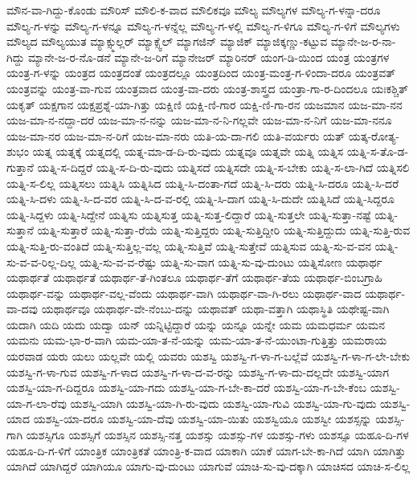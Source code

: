 {ಮೌನ-ವಾ-ಗಿದ್ದು-ಕೊಂಡು
ಮೌರಿಸ್
ಮೌಲಿ-ಕ-ವಾದ
ಮೌಲಿಕವೂ
ಮೌಲ್ಯ
ಮೌಲ್ಯಗಳ
ಮೌಲ್ಯ-ಗ-ಳನ್ನಾ-ದರೂ
ಮೌಲ್ಯ-ಗ-ಳನ್ನು
ಮೌಲ್ಯ-ಗ-ಳನ್ನೂ
ಮೌಲ್ಯ-ಗ-ಳನ್ನೆಲ್ಲ
ಮೌಲ್ಯ-ಗ-ಳಲ್ಲಿ
ಮೌಲ್ಯ-ಗ-ಳಿಗೂ
ಮೌಲ್ಯ-ಗ-ಳಿಗೆ
ಮೌಲ್ಯಗಳು
ಮೌಲ್ಯದ
ಮೌಲ್ಯಯುತ
ಮ್ಯಾಕ್ಸ್ಮುಲ್ಲರ್
ಮ್ಯಾಕ್ಸ್ವೆಲ್
ಮ್ಯಾಗಜಿನ್
ಮ್ಯಾಜಿಕ್
ಮ್ಯಾಜಿಕ್ಕಣ್ಣು-ಕಟ್ಟುವ
ಮ್ಯಾನೇ-ಜ-ರ-ನಾ-ಗಿದ್ದು
ಮ್ಯಾನೇ-ಜ-ರ-ನೊ-ಡನೆ
ಮ್ಯಾನೇ-ಜ-ರಿಗೆ
ಮ್ಯಾನೇಜರ್
ಮ್ಯಾರಿನರ್
ಯಂಗ-ಡಿ-ಯಿಂದ
ಯಂತ್ರ
ಯಂತ್ರಗಳ
ಯಂತ್ರ-ಗ-ಳನ್ನು
ಯಂತ್ರದ
ಯಂತ್ರದಂತೆ
ಯಂತ್ರದಲ್ಲೂ
ಯಂತ್ರದಿಂದ
ಯಂತ್ರ-ಮಂತ್ರ-ಗ-ಳಿಂದಾ-ದರೂ
ಯಂತ್ರವತ್
ಯಂತ್ರವನ್ನು
ಯಂತ್ರ-ವಾ-ಗುವ
ಯಂತ್ರವಾದ
ಯಂತ್ರ-ವಾ-ದರು
ಯಂತ್ರ-ಶಾಸ್ತ್ರದ
ಯಂತ್ರಾ-ಗಾ-ರ-ದಿಂದಲೂ
ಯಃಕಶ್ಚಿತ್
ಯಕೃತ್
ಯಕ್ಷಗಾನ
ಯಕ್ಷಪ್ರಶ್ನೆ-ಯಾ-ಗಿತ್ತು
ಯಕ್ಷಿಣಿ
ಯಕ್ಷಿ-ಣಿ-ಗಾರ
ಯಕ್ಷಿ-ಣಿ-ಗಾ-ರನ
ಯಜಮಾನ
ಯಜ-ಮಾ-ನನ
ಯಜ-ಮಾ-ನ-ನದ್ದಾ-ದರೆ
ಯಜ-ಮಾ-ನ-ನನ್ನು
ಯಜ-ಮಾ-ನ-ನಿ-ಗಲ್ಲವೇ
ಯಜ-ಮಾ-ನ-ನಿಗೆ
ಯಜ-ಮಾ-ನನೂ
ಯಜ-ಮಾ-ನರ
ಯಜ-ಮಾ-ನ-ರಿಗೆ
ಯಜ-ಮಾ-ನರು
ಯತಿ-ಯ-ದಾ-ಗಲಿ
ಯತಿ-ವರ್ಯರು
ಯತ್
ಯತ್ಕ-ರೋತ್ಯ-ಶುಭಂ
ಯತ್ನ
ಯತ್ನಕ್ಕೆ
ಯತ್ನದಲ್ಲಿ
ಯತ್ನ-ಮಾ-ಡ-ದಿ-ರು-ವುದು
ಯತ್ನವೂ
ಯತ್ನವೇ
ಯತ್ನಿ
ಯತ್ನಿಸ
ಯತ್ನಿ-ಸ-ತೊ-ಡ-ಗುತ್ತಾನೆ
ಯತ್ನಿ-ಸ-ದಿದ್ದರೆ
ಯತ್ನಿ-ಸ-ದಿ-ರು-ವುದು
ಯತ್ನಿಸದೆ
ಯತ್ನಿಸದೇ
ಯತ್ನಿ-ಸ-ಬೇಕು
ಯತ್ನಿ-ಸ-ಲಾ-ಗಿದೆ
ಯತ್ನಿಸಲಿ
ಯತ್ನಿ-ಸ-ಲಿಲ್ಲ
ಯತ್ನಿಸಲು
ಯತ್ನಿಸಿ
ಯತ್ನಿಸಿದ
ಯತ್ನಿ-ಸಿ-ದಂತಾ-ಗದೆ
ಯತ್ನಿ-ಸಿ-ದರು
ಯತ್ನಿ-ಸಿ-ದರೂ
ಯತ್ನಿ-ಸಿ-ದರೆ
ಯತ್ನಿ-ಸಿ-ದಳು
ಯತ್ನಿ-ಸಿ-ದ-ವರ
ಯತ್ನಿ-ಸಿ-ದ-ವ-ರಲ್ಲಿ
ಯತ್ನಿ-ಸಿ-ದಾಗ
ಯತ್ನಿ-ಸಿ-ದುದೇ
ಯತ್ನಿಸಿದೆ
ಯತ್ನಿ-ಸಿದ್ದರೂ
ಯತ್ನಿ-ಸಿದ್ದಳು
ಯತ್ನಿ-ಸಿದ್ದೇನೆ
ಯತ್ನಿಸು
ಯತ್ನಿಸುತ್ತ
ಯತ್ನಿ-ಸುತ್ತ-ಲಿದ್ದಾರೆ
ಯತ್ನಿ-ಸುತ್ತಲೇ
ಯತ್ನಿ-ಸುತ್ತಾ-ನಷ್ಟೆ
ಯತ್ನಿ-ಸುತ್ತಾನೆ
ಯತ್ನಿ-ಸುತ್ತಾರೆ
ಯತ್ನಿ-ಸುತ್ತಾ-ರೆಯೆ
ಯತ್ನಿ-ಸುತ್ತಿದ್ದರು
ಯತ್ನಿ-ಸುತ್ತಿದ್ದೀರಿ
ಯತ್ನಿ-ಸುತ್ತಿದ್ದುದು
ಯತ್ನಿ-ಸುತ್ತಿ-ರುವ
ಯತ್ನಿ-ಸುತ್ತಿ-ರು-ವಂತಿದೆ
ಯತ್ನಿ-ಸುತ್ತಿಲ್ಲ-ವಲ್ಲ
ಯತ್ನಿ-ಸುತ್ತಿವೆ
ಯತ್ನಿ-ಸುತ್ತೇವೆ
ಯತ್ನಿಸುವ
ಯತ್ನಿ-ಸು-ವ-ವನ
ಯತ್ನಿ-ಸು-ವ-ವ-ರಿಲ್ಲ-ದಿಲ್ಲ
ಯತ್ನಿ-ಸು-ವ-ವ-ರೆಷ್ಟು
ಯತ್ನಿ-ಸು-ವಾಗ
ಯತ್ನಿ-ಸು-ವು-ದುಂಟು
ಯತ್ನಿಸೋಣ
ಯಥಾರ್ಥ
ಯಥಾರ್ಥತೆ
ಯಥಾರ್ಥತೆ
ಯಥಾರ್ಥ-ತೆ-ಗಿಂತಲೂ
ಯಥಾರ್ಥ-ತೆಗೆ
ಯಥಾರ್ಥ-ತೆಯ
ಯಥಾರ್ಥ-ಬಿಂಬಗ್ರಾಹಿ
ಯಥಾರ್ಥ-ವನ್ನು
ಯಥಾರ್ಥ-ವಲ್ಲ-ವೆಂದು
ಯಥಾರ್ಥ-ವಾಗಿ
ಯಥಾರ್ಥ-ವಾ-ಗಿ-ರಲು
ಯಥಾರ್ಥ-ವಾದ
ಯಥಾರ್ಥ-ವಾ-ದವು
ಯಥಾರ್ಥವೂ
ಯಥಾರ್ಥ-ವೇ-ನೆಂಬು-ದನ್ನು
ಯಥಾವತ್
ಯಥಾ-ವತ್ತಾಗಿ
ಯಥಾಸ್ಥಿತಿ
ಯಥೇಷ್ಟ-ವಾಗಿ
ಯದಾಗಿ
ಯದಿ
ಯದು
ಯದ್ವಾ
ಯನ್
ಯನ್ನಿಟ್ಟಿದ್ದಾರೆ
ಯನ್ನು
ಯನ್ನೂ
ಯನ್ನೇ
ಯಮ
ಯಮಧರ್ಮ
ಯಮನ
ಯಮನು
ಯಮ-ಭಾ-ರ-ವಾಗಿ
ಯಮ-ಯಾ-ತ-ನೆ-ಯನ್ನು
ಯಮ-ಯಾ-ತ-ನೆ-ಯುಂಟಾ-ಗುತ್ತಿತ್ತು
ಯಮರಾಯ
ಯರವಾಡ
ಯರು
ಯಲು
ಯಲ್ಲವೇ
ಯಲ್ಲಿ
ಯವರು
ಯಶಸ್ವಿ
ಯಶಸ್ವಿ-ಗ-ಳಾ-ಗ-ಬಲ್ಲೆವೆ
ಯಶಸ್ವಿ-ಗ-ಳಾ-ಗ-ಲೇ-ಬೇಕು
ಯಶಸ್ವಿ-ಗ-ಳಾ-ಗುವ
ಯಶಸ್ವಿ-ಗ-ಳಾದ
ಯಶಸ್ವಿ-ಗ-ಳಾ-ದ-ವ-ರನ್ನು
ಯಶಸ್ವಿ-ಗ-ಳಾ-ದು-ದಲ್ಲದೇ
ಯಶಸ್ವಿ-ಯಾಗ
ಯಶಸ್ವಿ-ಯಾ-ಗ-ದಿದ್ದರೂ
ಯಶಸ್ವಿ-ಯಾ-ಗದು
ಯಶಸ್ವಿ-ಯಾ-ಗ-ಬೇ-ಕಾ-ದರೆ
ಯಶಸ್ವಿ-ಯಾ-ಗ-ಬೇ-ಕೆಂಬ
ಯಶಸ್ವಿ-ಯಾ-ಗ-ಲಾ-ರೆವು
ಯಶಸ್ವಿ-ಯಾಗಿ
ಯಶಸ್ವಿ-ಯಾ-ಗಿ-ರು-ವುದು
ಯಶಸ್ವಿ-ಯಾ-ಗುವಿ
ಯಶಸ್ವಿ-ಯಾ-ಗು-ವುದು
ಯಶಸ್ವಿ-ಯಾದ
ಯಶಸ್ವಿ-ಯಾ-ದರೂ
ಯಶಸ್ವಿ-ಯಾ-ದೆವು
ಯಶಸ್ವಿ-ಯಾ-ಯಿತು
ಯಶಸ್ವಿಯೂ
ಯಶಸ್ವೀ
ಯಶಸ್ಸನ್ನು
ಯಶಸ್ಸಿ-ಗಾಗಿ
ಯಶಸ್ಸಿಗೂ
ಯಶಸ್ಸಿಗೆ
ಯಶಸ್ಸಿನ
ಯಶಸ್ಸಿ-ನತ್ತ
ಯಶಸ್ಸು
ಯಶಸ್ಸು-ಗಳ
ಯಶಸ್ಸು-ಗಳು
ಯಶಸ್ಸೂ
ಯಹೂ-ದಿ-ಗಳ
ಯಹೂ-ದಿ-ಗ-ಳಿಗೆ
ಯಾಂತ್ರಿಕ
ಯಾಂತ್ರಿಕತೆ
ಯಾಂತ್ರಿ-ಕ-ವಾದ
ಯಾಕಾಗಿ
ಯಾಕೆ
ಯಾಗ-ಬೇ-ಕಾ-ಗಿದೆ
ಯಾಗಿ
ಯಾಗಿತ್ತು
ಯಾಗಿದೆ
ಯಾಗಿದ್ದರೆ
ಯಾಗಿಯೂ
ಯಾಗು-ವು-ದುಂಟು
ಯಾಗುವೆ
ಯಾಚಿ-ಸು-ವು-ದಕ್ಕಾಗಿ
ಯಾಚಿಸದ
ಯಾಚಿ-ಸ-ಲಿಲ್ಲ
}
